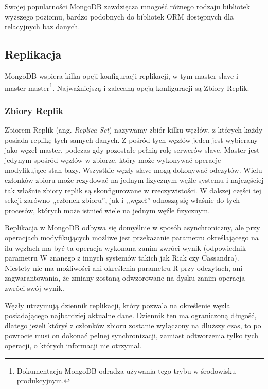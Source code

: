 Swojej popularności MongoDB zawdzięcza mnogość różnego rodzaju bibliotek wyższego poziomu, bardzo podobnych do bibliotek ORM dostępnych dla relacyjnych baz danych.

\subsection*{Replikacja}
\label{sec:mongodb-replication}

MongoDB wspiera kilka opcji konfiguracji replikacji, w tym master-slave i master-master\footnote{Dokumentacja MongoDB odradza używania tego trybu w środowisku produkcyjnym.}.
Najważniejszą i zalecaną opcją konfiguracji są Zbiory Replik.

\subsubsection*{Zbiory Replik}

Zbiorem Replik (ang. \emph{Replica Set}) nazywamy zbiór kilku węzłów, z których każdy posiada replikę tych samych danych.
Z pośród tych węzłów jeden jest wybierany jako węzeł master, podczas gdy pozostałe pełnią rolę serwerów slave.
Master jest jedynym spośród węzłów w zbiorze, który może wykonywać operacje modyfikujące stan bazy.
Wszystkie węzły slave mogą dokonywać odczytów.
Wielu członków zbioru może rezydować na jednym fizycznym węźle systemu i najczęściej tak właśnie zbiory replik są skonfigurowane w rzeczywistości.
W dalszej części tej sekcji zarówno ,,członek zbioru'', jak i ,,węzeł'' odnoszą się właśnie do tych procesów, których może istnieć wiele na jednym węźle fizycznym.

Replikacja w MongoDB odbywa się domyślnie w sposób asynchroniczny, ale przy operacjach modyfikujących możliwe jest przekazanie parametru określającego na ilu węzłach ma być ta operacja wykonana zanim zwróci wynik (odpowiednik parametru W znanego z innych systemów takich jak Riak czy Cassandra).
Niestety nie ma możliwości ani określenia parametru R przy odczytach, ani zagwarantowania, że zmiany zostaną odwzorowane na dysku zanim operacja zwróci swój wynik.

Węzły utrzymują dziennik replikacji, który pozwala na określenie węzła posiadającego najbardziej aktualne dane.
Dziennik ten ma ograniczoną długość, dlatego jeżeli któryś z członków zbioru zostanie wyłączony na dłuższy czas, to po powrocie musi on dokonać pełnej synchronizacji, zamiast odtworzenia tylko tych operacji, o których informacji nie otrzymał.

